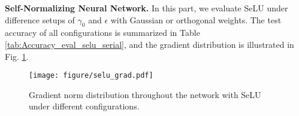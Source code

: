 \documentclass[10pt,journal,compsoc]{IEEEtran}
\begin{document}
\textbf{Self-Normalizing Neural Network.}
In this part, we evaluate SeLU under difference setups of $\gamma_0$ and $\epsilon$ with Gaussian or orthogonal weights. The test accuracy of all configurations is summarized in Table \ref{tab:Accuracy_eval_selu_serial}, and the gradient distribution is illustrated in Fig. \ref{fig:selu_grad}.

\begin{table}[ht]
\vspace{-10pt}
\caption{Test accuracy of SeLU under different configurations (Cl=$95\%$). All the methods except for \cite{klambauer2017self} are ours.}
\centering
{}
\label{tab:Accuracy_eval_selu_serial}
\end{table}
\begin{figure}[ht]
\centering
\texttt{[image: figure/selu\_grad.pdf]}
\caption{Gradient norm distribution throughout the network with SeLU under different configurations.}
\label{fig:selu_grad}
\vspace{-15pt}
\end{figure}
\end{document}
